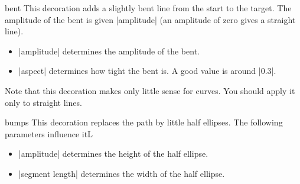 \begin{decoration}{bent}
  This decoration adds a slightly bent line from the start to the
  target. The amplitude of the bent is given |amplitude|
  (an amplitude of zero gives a straight line). 
  \begin{itemize}
  \item |amplitude|
    determines the amplitude of the bent.
  \item |aspect|
    determines how tight the bent is. A good value is around |0.3|. 
  \end{itemize}
  Note that this decoration makes only little sense for curves. You
  should apply it only to straight lines.
\begin{codeexample}[]
\end{codeexample}
\begin{codeexample}[]
\end{codeexample}
\end{decoration}


\begin{decoration}{bumps}
  This decoration replaces the path by little half ellipses. The
  following parameters influence itL
  \begin{itemize}
  \item |amplitude|
    determines the height of the half ellipse.
  \item |segment length|
    determines the width of the half ellipse.
  \end{itemize}
\begin{codeexample}[]
\end{codeexample}
\end{decoration}


